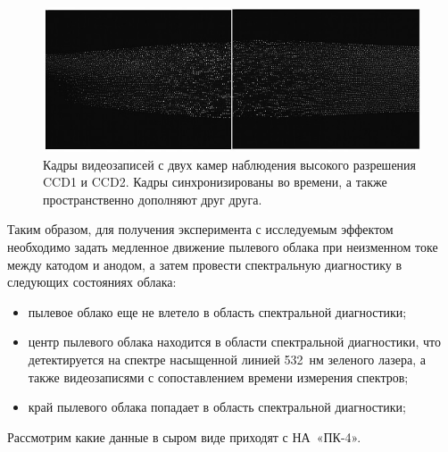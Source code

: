 \begin{figure}[t]
  \centering
  \includegraphics[width=16cm]{figures/high_resolution_cameras}
  \caption{Кадры видеозаписей с двух камер наблюдения высокого разрешения CCD1 и CCD2. Кадры синхронизированы во времени, а также пространственно дополняют друг друга.}
  \label{fig:high_resolution_cameras}
\end{figure}

Таким образом, для получения эксперимента с исследуемым эффектом необходимо задать медленное движение пылевого облака при
неизменном токе между катодом и анодом, а затем провести спектральную диагностику в следующих состояниях облака:
\begin{itemize}
\item пылевое облако еще не влетело в область спектральной диагностики;
\item центр пылевого облака находится в области спектральной диагностики, что детектируется на спектре насыщенной
линией 532~нм зеленого лазера, а также видеозаписями с сопоставлением времени измерения спектров;
\item край пылевого облака попадает в область спектральной диагностики;
\end{itemize}

Рассмотрим какие данные в сыром виде приходят с НА~«ПК-4».

